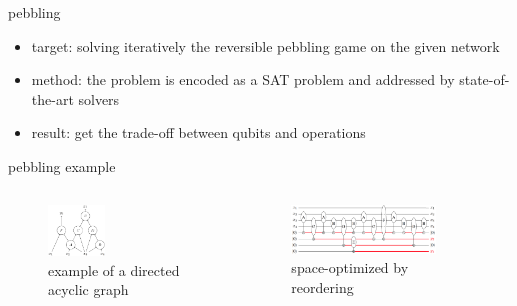   \begin{frame}{pebbling}
    \begin{itemize}
      \item target: solving iteratively the reversible pebbling game on the given network
      \item method: the problem is encoded as a SAT problem and addressed by state-of-the-art solvers
      \item result: get the trade-off between qubits and operations
    \end{itemize}
  \end{frame}
  \begin{frame}{pebbling example}
    \begin{columns}
        \begin{minipage}[c][0.4\textheight][c]{\linewidth}
          \begin{figure}[h]
            \centering
            \includegraphics[width=0.4\textwidth]{figure/DAG.png}
            \caption{example of a directed acyclic graph}
          \end{figure}
        \end{minipage}
        \begin{minipage}[c][0.4\textheight][c]{\linewidth}
          \begin{figure}[h]
            \centering
            \includegraphics[width=0.8\textwidth]{figure/c.png}
            \caption{space-optimized by reordering}
          \end{figure}
        \end{minipage}
        

\end{columns}
\end{frame}
